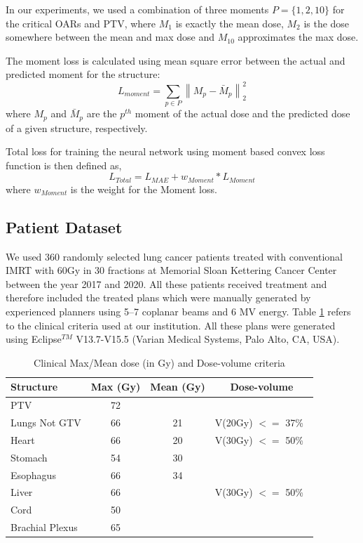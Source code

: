 \documentclass[10pt]{article}
\newcommand{\norm}[1]{\left\lVert#1\right\rVert}
\begin{document}
In our experiments, we used a combination of three moments $P = \{1, 2, 10\}$ for the critical OARs and PTV, where $M_{1}$ is exactly the mean dose, $M_{2}$ is the dose somewhere between the mean and max dose and $M_{10}$ approximates the max dose. 

The moment loss is calculated using mean square error between the actual and predicted moment for the structure: 
\begin{equation}\label{MAE-Moment-loss}
    L_{moment} = \sum_{p\in P} \norm{M_p - \bar{M}_p}_2^2
\end{equation}
where $M_p$ and $ \bar{M}_p$ are the $p^{th}$ moment of the actual dose and the predicted dose of a given structure, respectively.


{Total loss for training the neural network using moment based convex loss function is then defined as,
\begin{equation}
    L_{Total} = L_{MAE} + w_{Moment}*L_{Moment}
\end{equation}
where $w_{Moment}$ is the weight for the Moment loss.}

\subsection{Patient Dataset}
We used 360 randomly selected lung cancer patients treated with conventional IMRT with 60Gy in 30 fractions at Memorial Sloan Kettering Cancer Center between the year 2017 and 2020. All these patients received treatment and therefore included the treated plans which were manually generated by experienced planners using 5--7 coplanar beams and 6 MV energy. Table \ref{table:1} refers to the clinical criteria used at our institution. All these plans were generated using Eclipse$^{TM}$ V13.7-V15.5 (Varian Medical Systems, Palo Alto, CA, USA). 


\begin{table}[ht!]
\caption{Clinical Max/Mean dose (in Gy) and Dose-volume criteria}
\label{table:1}
\centering
 \begin{tabular}
 {|l |c | c| c|} 
 \hline
 \textbf{Structure} & \textbf{Max (Gy)} & \textbf{Mean (Gy)} & \textbf{Dose-volume} \\ [0.5ex] 
 \hline
 PTV & 72 &  &  \\ 
 Lungs Not GTV	& 66 & 21 & V(20Gy) $<=$ 37\%\ \\
 Heart & 66 & 20 & V(30Gy) $<=$ 50\%\ \\
 Stomach & 54 & 30 & \\
 Esophagus & 66 & 34 & \\
 Liver & 66 &  & V(30Gy) $<=$ 50\%\ \\ 
 Cord & 50 & & \\
Brachial Plexus	& 65 &  & \\ 
 \hline
\end{tabular}
\end{table}
\end{document}
